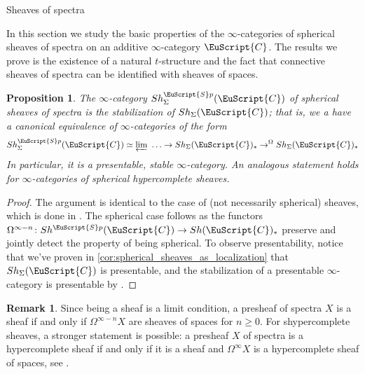 \documentclass[oneside,a4paper]{amsart}
\makeatletter
\newcommand{\euscr}[1]{\EuScript{#1}} %
\newcommand{\ccat}{\euscr{C}} %
\newcommand{\spectra}{\euscr{S}p} %
\theoremstyle{plain}
\newtheorem{prop}[thm]{Proposition}
\theoremstyle{definition}
\newtheorem{rem}[thm]{Remark}
\theoremstyle{remark}
\def\subsection{\@startsection{subsection}{1}%
  \z@{.7\linespacing\@plus\linespacing}{.5\linespacing}%
  {\normalfont\bfseries\centering}}%
\makeatother
\begin{document}
\subsection{Sheaves of spectra}

In this section we study the basic properties of the $\infty$-categories of spherical sheaves of spectra on an additive $\infty$-category $\ccat$. The results we prove is the existence of a natural $t$-structure and the fact that connective sheaves of spectra can be identified with sheaves of spaces.

\begin{prop}
\label{prop:sheaves_of_spectra_as_stabilization}
The $\infty$-category $Sh_{\Sigma}^{\spectra}(\ccat)$ of spherical sheaves of spectra is the stabilization of $Sh_{\Sigma}(\ccat)$; that is, we a have a canonical equivalence of $\infty$-categories of the form 
\[
Sh_{\Sigma}^{\spectra}(\ccat) \simeq \varprojlim \ \ldots \rightarrow Sh_{\Sigma}(\ccat)_{*} \rightarrow ^{\Omega} Sh_{\Sigma}(\ccat)_{*}
\]
In particular, it is a presentable, stable $\infty$-category. An analogous statement holds for $\infty$-categories of spherical hypercomplete sheaves.
\end{prop}

\begin{proof}
The argument is identical to the case of (not necessarily spherical) sheaves, which is done in \cite[1.3.3.2]{lurie_spectral_algebraic_geometry}. The spherical case follows as the functors $\Omega^{\infty -n} \colon Sh^{\spectra}(\ccat) \rightarrow Sh(\ccat)_{*}$ preserve and jointly detect the property of being spherical. To observe presentability, notice that we've proven in \cref{cor:spherical_sheaves_as_localization} that $Sh_{\Sigma}(\ccat)$ is presentable, and the stabilization of a presentable $\infty$-category is presentable by \cite[1.4.4.4]{higher_algebra}.
\end{proof}

\begin{rem}
\label{rem:hypercompleteness_of_a_sheaf_detected_by_omega_infty}
Since being a sheaf is a limit condition, a presheaf of spectra $X$ is a sheaf if and only if $\Omega^{\infty - n} X$ are sheaves of spaces for $n \geq 0$. For shypercomplete sheaves, a stronger statement is possible: a presheaf $X$ of spectra is a hypercomplete sheaf if and only if it is a sheaf and $\Omega^{\infty} X$ is a hypercomplete sheaf of spaces, see \cite[1.3.3.3]{lurie_spectral_algebraic_geometry}.
\end{rem}
\end{document}

